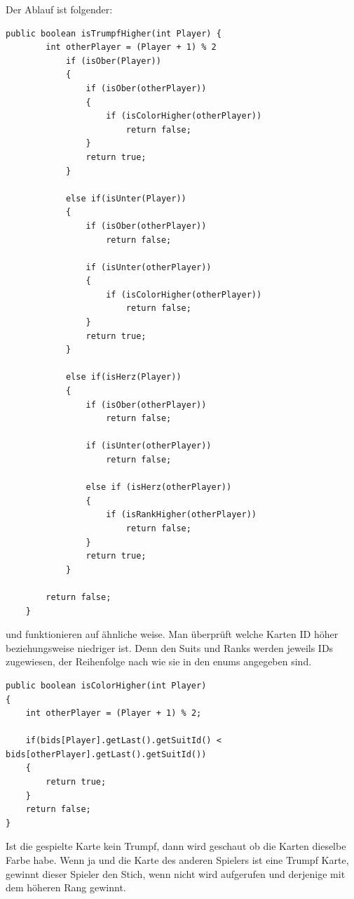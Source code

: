 Der Ablauf ist folgender:
\begin{lstlisting}[caption={isTrumpfHigher Methode},captionpos=b]
    public boolean isTrumpfHigher(int Player) {
        int otherPlayer = (Player + 1) % 2
            if (isOber(Player))
            {
                if (isOber(otherPlayer))
                {
                    if (isColorHigher(otherPlayer))
                        return false; 
                }
                return true;
            }

            else if(isUnter(Player))
            {
                if (isOber(otherPlayer))
                    return false;

                if (isUnter(otherPlayer))
                {
                    if (isColorHigher(otherPlayer))
                        return false;
                }
                return true;
            }

            else if(isHerz(Player))
            {
                if (isOber(otherPlayer))
                    return false;

                if (isUnter(otherPlayer))
                    return false;

                else if (isHerz(otherPlayer))
                {
                    if (isRankHigher(otherPlayer))
                        return false; 
                }
                return true;
            }

        return false;
    }
    \end{lstlisting}
 
 und  funktionieren auf ähnliche weise. Man überprüft welche Karten ID höher beziehungsweise niedriger ist.
Denn den Suits und Ranks werden jeweils IDs zugewiesen, der Reihenfolge nach wie sie in den enums angegeben sind.

\begin{lstlisting}[caption={IDs am Beispiel von isColorHigher},captionpos=b]
public boolean isColorHigher(int Player)
{
    int otherPlayer = (Player + 1) % 2;

    if(bids[Player].getLast().getSuitId() < bids[otherPlayer].getLast().getSuitId())
    {
        return true;
    }
    return false;
}
\end{lstlisting}

Ist die gespielte Karte kein Trumpf, dann wird geschaut ob die Karten dieselbe
Farbe habe. Wenn ja und die Karte des anderen Spielers ist eine Trumpf Karte,
gewinnt dieser Spieler den Stich, wenn nicht wird 
aufgerufen und derjenige mit dem höheren Rang gewinnt.

